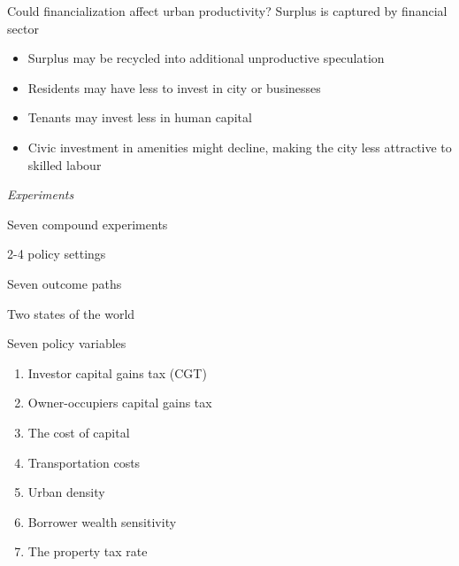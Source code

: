 \documentclass[]{beamer} %
\begin{document}
\begin{frame}{Could financialization affect urban productivity?}
\vspace{-.75cm}\Large Surplus is captured by financial sector
\vspace{.75cm}
\begin{itemize}\Large

\item Surplus may be recycled into additional unproductive speculation
\item Residents may have less to invest in city or businesses
\item Tenants may invest less in human capital
\item Civic investment in amenities might decline, making the city less attractive to skilled labour
\end{itemize}
\end{frame}

\begin{frame}{}
  \centering \Huge
  \emph{Experiments}
\vspace{1cm}

 \Large Seven compound experiments 
 
 2-4 policy settings  
 \vspace{.5cm}

Seven outcome paths 

Two states of the world 
\end{frame}


\begin{frame}{Seven policy variables}\Large
\begin{enumerate}%
\item Investor capital gains tax (CGT)
\item Owner-occupiers capital gains tax
\item The cost of capital%
\item Transportation costs%
\item Urban density%
\item Borrower wealth sensitivity%
\item The property tax rate%
\end{enumerate}


\end{frame}%
\end{document}
